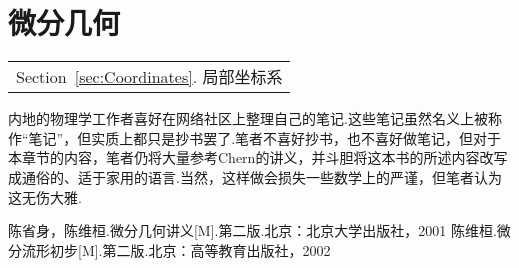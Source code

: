 \part{微分几何}\label{Part:Differential_Geometry}
	\begin{margintable}\vspace{1.4in}%
		\begin{tabularx}{\marginparwidth}{|X}
			Section~\ref{sec:Coordinates}. 局部坐标系\\
		\end{tabularx}
	\end{margintable}
	内地的物理学工作者喜好在网络社区上整理自己的笔记.这些笔记虽然名义上被称作“笔记”，但实质上都只是抄书罢了.笔者不喜好抄书，也不喜好做笔记，但对于本章节的内容，笔者仍将大量参考Chern的讲义，并斗胆将这本书的所述内容改写成通俗的、适于家用的语言.当然，这样做会损失一些数学上的严谨，但笔者认为这无伤大雅.
	
	
	\begin{thebibliography}{9}%
	陈省身，陈维桓.微分几何讲义[M].第二版.北京：北京大学出版社，2001
	陈维桓.微分流形初步[M].第二版.北京：高等教育出版社，2002
	\end{thebibliography}